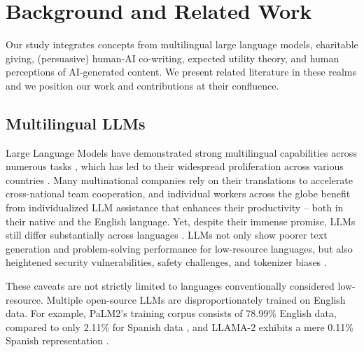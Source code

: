 
\section{Background and Related Work}
Our study integrates concepts from multilingual large language models, charitable giving, (persuasive) human-AI co-writing, expected utility theory, and human perceptions of AI-generated content. We present related literature in these realms and we position our work and contributions at their confluence.




\subsection{Multilingual LLMs}
Large Language Models have demonstrated strong multilingual capabilities across numerous tasks \cite{zhao2023survey,bang2023multitask,le2023bloom}, which has led to their widespread proliferation across various countries \cite{Kaddour_2023}. Many multinational companies rely on their translations to accelerate cross-national team cooperation, and individual workers across the globe benefit from individualized LLM assistance that enhances their productivity -- both in their native and the English language. Yet, despite their immense promise, LLMs still differ substantially across languages \cite{Ahuja2023-zu,Zhang2024-mp,huang2023not,bang2023multitask,joshi2020state,jiao2023chatgpt,hada2024akal}. LLMs not only show poorer text generation and problem-solving performance for low-resource languages, but also heightened security vulnerabilities, safety challenges, and tokenizer biases \cite{Shen_2024,ahia2023languagescostsametokenization,Ahuja2023-zu}. 




These caveats are not strictly limited to languages conventionally considered low-resource. Multiple open-source LLMs are disproportionately trained on English data. For example, PaLM2's training corpus consists of 78.99\% English data, compared to only 2.11\% for Spanish data \cite{chowdhery2023palm}, and LLAMA-2 exhibits a mere 0.11\% Spanish representation \cite{touvron2023llama}. 


